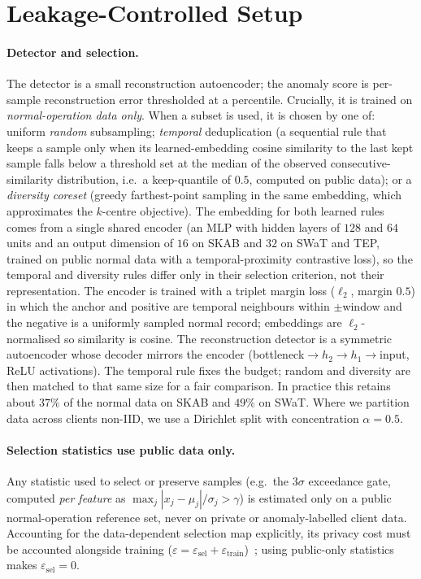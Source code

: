 \documentclass[pdflatex,sn-mathphys-num]{sn-jnl}
\theoremstyle{thmstyleone}
\theoremstyle{thmstyletwo}
\theoremstyle{thmstylethree}
\begin{document}
\section{Leakage-Controlled Setup}\label{sec:setup}

\paragraph{Detector and selection.} The detector is a small reconstruction
autoencoder; the anomaly score is per-sample reconstruction error thresholded at a
percentile. Crucially, it is trained on \emph{normal-operation data only}. When a
subset is used, it is chosen by one of: uniform \emph{random} subsampling;
\emph{temporal} deduplication (a sequential rule that keeps a sample only when its
learned-embedding cosine similarity to the last kept sample falls below a threshold
set at the median of the observed consecutive-similarity distribution, i.e.\ a
keep-quantile of $0.5$, computed on public data); or a \emph{diversity coreset}
(greedy farthest-point sampling in the same embedding, which approximates the
$k$-centre objective). The embedding for both learned rules comes from a single shared
encoder (an MLP with hidden layers of $128$ and $64$ units and an output dimension of
$16$ on SKAB and $32$ on SWaT and TEP, trained on public normal data with a
temporal-proximity contrastive loss), so the temporal and diversity rules differ only
in their selection criterion, not their representation. The encoder is trained with a
triplet margin loss ($\ell_2$, margin $0.5$) in which the anchor and positive are
temporal neighbours within $\pm$window and the negative is a uniformly sampled normal
record; embeddings are $\ell_2$-normalised so similarity is cosine. The reconstruction
detector is a symmetric autoencoder whose decoder mirrors the encoder
(bottleneck$\to$$h_2$$\to$$h_1$$\to$input, ReLU activations). The
temporal rule fixes the budget; random and diversity are then matched to that same
size for a fair comparison. In practice this retains about $37\%$ of the normal data
on SKAB and $49\%$ on SWaT. Where we partition data across clients non-IID, we use a
Dirichlet split with concentration $\alpha{=}0.5$.

\paragraph{Selection statistics use public data only.} Any statistic used to
select or preserve samples (e.g.\ the $3\sigma$ exceedance gate, computed
\emph{per feature} as $\max_j |x_j-\mu_j|/\sigma_j > \gamma$) is estimated only on
a public normal-operation reference set, never on private or anomaly-labelled
client data. Accounting for the data-dependent selection map explicitly, its privacy cost
must be accounted alongside training ($\varepsilon=\varepsilon_{\text{sel}}+
\varepsilon_{\text{train}}$)~\cite{nguyen2025coreset}; using public-only statistics
makes $\varepsilon_{\text{sel}}=0$.
\end{document}
